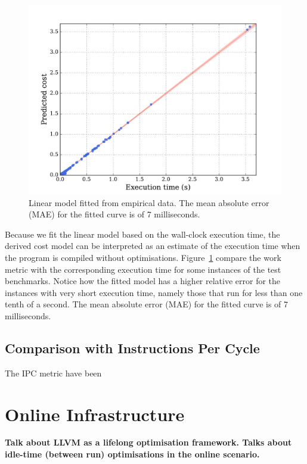 \begin{figure}[htb]
    \centering
    \includegraphics[width=0.9\linewidth]{figs/cost-model.pdf}
    \caption{Linear model fitted from empirical data. The mean absolute error (MAE) for the fitted curve is of 7 milliseconds.}
    \label{fig:cost-model}
\end{figure}

Because we fit the linear model based on the wall-clock execution time, the derived cost model can be interpreted as an estimate of the execution time when the program is compiled without optimisations.
Figure~\ref{fig:cost-model} compare the work metric with the corresponding execution time for some instances of the test benchmarks.
Notice how the fitted model has a higher relative error for the instances with very short execution time, namely those that run for less than one tenth of a second.
The mean absolute error (MAE) for the fitted curve is of 7 milliseconds.

\subsection{Comparison with Instructions Per Cycle}

The IPC metric have been 

\section{Online {\IterComp} Infrastructure} \label{sec:oic-infra}

\textbf{Talk about LLVM as a lifelong optimisation framework. Talks about idle-time (between run) optimisations in the online scenario.}

